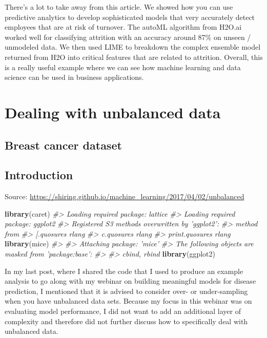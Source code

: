 \documentclass[]{book}
\newenvironment{Shaded}{\begin{snugshade}}{\end{snugshade}}
\newcommand{\CommentTok}[1]{\textcolor[rgb]{0.56,0.35,0.01}{\textit{#1}}}
\newcommand{\KeywordTok}[1]{\textcolor[rgb]{0.13,0.29,0.53}{\textbf{#1}}}
\newcommand{\NormalTok}[1]{#1}
\begin{document}
There's a lot to take away from this article. We showed how you can use predictive analytics to develop sophisticated models that very accurately detect employees that are at risk of turnover. The autoML algorithm from H2O.ai worked well for classifying attrition with an accuracy around 87\% on unseen / unmodeled data. We then used LIME to breakdown the complex ensemble model returned from H2O into critical features that are related to attrition. Overall, this is a really useful example where we can see how machine learning and data science can be used in business applications.

\hypertarget{dealing-with-unbalanced-data}{%
\chapter{Dealing with unbalanced data}\label{dealing-with-unbalanced-data}}

\hypertarget{breast-cancer-dataset}{%
\section{Breast cancer dataset}\label{breast-cancer-dataset}}

\hypertarget{introduction-1}{%
\section{Introduction}\label{introduction-1}}

Source: \url{https://shiring.github.io/machine_learning/2017/04/02/unbalanced}

\begin{Shaded}
\begin{Highlighting}[]
\KeywordTok{library}\NormalTok{(caret)}
\CommentTok{#> Loading required package: lattice}
\CommentTok{#> Loading required package: ggplot2}
\CommentTok{#> Registered S3 methods overwritten by 'ggplot2':}
\CommentTok{#>   method         from }
\CommentTok{#>   [.quosures     rlang}
\CommentTok{#>   c.quosures     rlang}
\CommentTok{#>   print.quosures rlang}
\KeywordTok{library}\NormalTok{(mice)}
\CommentTok{#> }
\CommentTok{#> Attaching package: 'mice'}
\CommentTok{#> The following objects are masked from 'package:base':}
\CommentTok{#> }
\CommentTok{#>     cbind, rbind}
\KeywordTok{library}\NormalTok{(ggplot2)}
\end{Highlighting}
\end{Shaded}

In my last post, where I shared the code that I used to produce an example analysis to go along with my webinar on building meaningful models for disease prediction, I mentioned that it is advised to consider over- or under-sampling when you have unbalanced data sets. Because my focus in this webinar was on evaluating model performance, I did not want to add an additional layer of complexity and therefore did not further discuss how to specifically deal with unbalanced data.
\end{document}
